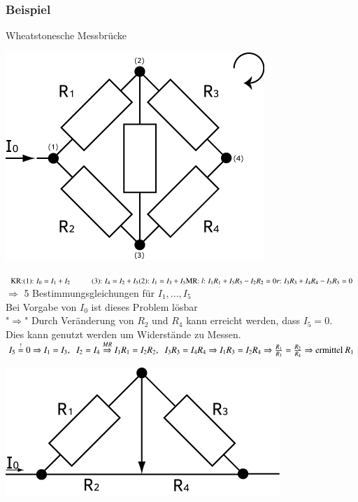 \documentclass[11pt]{article}
\begin{document}
	\subsubsection{Beispiel}Wheatstonesche Messbrücke
	\begin{center}
		\includegraphics[width=0.5\linewidth]{skizzen/15/15_4-6/15_5B4}
	\end{center}
	\begin{math}
		\text{KR:} \\
		\text{(1): } I_0 = I_1 + I_2 \hspace{1cm} \text{(3): } I_4 = I_2 + I_5\\
		\text{(2): } I_1 = I_3 + I_5 \\
		\hfill \\
		\text{MR: } \\
		\text{\emph{l}: } I_1R_1+I_5R_5-I_2R_2=0 \\
		\text{\emph{r}: } I_3R_3+I_4R_4-I_5R_5=0 
	\end{math}
	$ \Rightarrow $ 5 Bestimmungsgleichungen für $ I_1,...,I_5 $ \\
	Bei Vorgabe von $ I_0 $ ist dieses Problem lösbar \\
	"$ \Rightarrow $" Durch Veränderung von $ R_2 $ und $ R_4 $ kann erreicht werden, dass $ I_5=0 $.\\
	Dies kann genutzt werden um Widerstände zu Messen.\\
	\begin{math}
		I_5 \overset{!}{=} 0 \Rightarrow I_1 = I_3,\hspace{2mm} I_2 = I_4 \\
		\overset{MR}{\Rightarrow} I_1 R_1 = I_2 R_2,\hspace{2mm} I_3 R_3 = I_4 R_4 \Rightarrow I_1 R_3 = I_2 R_4 \\
		\Rightarrow \frac{R_1}{R_3} = \frac{R_2}{R_4} \Rightarrow \text{ermittel } R_1
	\end{math}

	\begin{center}
		\includegraphics[width=0.5\linewidth]{skizzen/15/15_4-6/15_5B5}
	\end{center}

	
				
\end{document}
